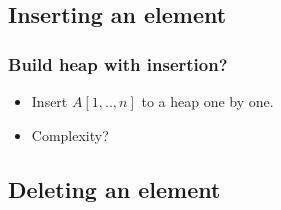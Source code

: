 \documentclass[UTF8,11pt]{beamer}
\begin{document}
\subsection{Inserting an element}
\begin{frame}
\frametitle{Build heap with insertion?}
\begin{center}
	\begin{itemize}
		\item Insert $A[1,..,n]$ to a heap  one by one.
		\item Complexity?
	\end{itemize}
\end{center}
\end{frame}

\subsection{Deleting an element}
\end{document}
